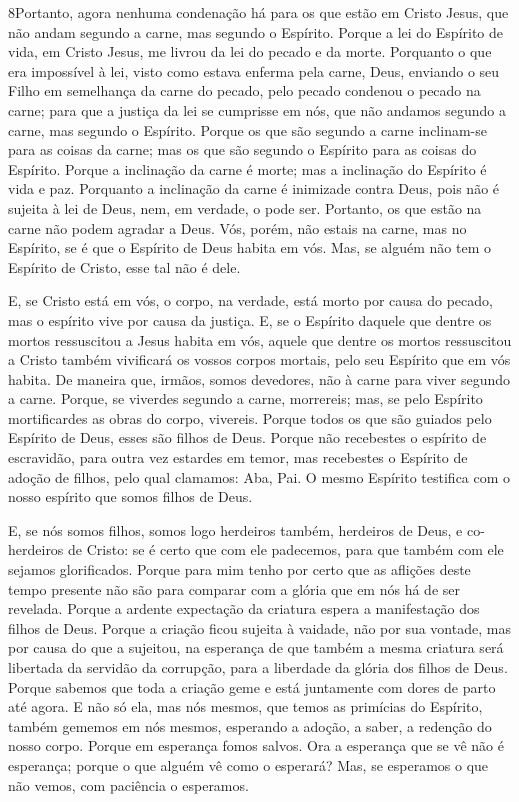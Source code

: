 \medskip

\lettrine{8} Portanto, agora nenhuma condenação há para os que
estão em Cristo Jesus, que não andam segundo a carne, mas segundo o
Espírito. Porque a lei do Espírito de vida, em Cristo Jesus, me
livrou da lei do pecado e da morte. Porquanto o que era
impossível à lei, visto como estava enferma pela carne, Deus,
enviando o seu Filho em semelhança da carne do pecado, pelo pecado
condenou o pecado na carne; para que a justiça da lei se
cumprisse em nós, que não andamos segundo a carne, mas segundo o
Espírito. Porque os que são segundo a carne inclinam-se para as
coisas da carne; mas os que são segundo o Espírito para as coisas do
Espírito. Porque a inclinação da carne é morte; mas a inclinação
do Espírito é vida e paz. Porquanto a inclinação da carne é
inimizade contra Deus, pois não é sujeita à lei de Deus, nem, em
verdade, o pode ser. Portanto, os que estão na carne não podem
agradar a Deus. Vós, porém, não estais na carne, mas no
Espírito, se é que o Espírito de Deus habita em vós. Mas, se alguém
não tem o Espírito de Cristo, esse tal não é dele.

E, se Cristo está em vós, o corpo, na verdade, está morto por
causa do pecado, mas o espírito vive por causa da justiça. E,
se o Espírito daquele que dentre os mortos ressuscitou a Jesus
habita em vós, aquele que dentre os mortos ressuscitou a Cristo
também vivificará os vossos corpos mortais, pelo seu Espírito que em
vós habita. De maneira que, irmãos, somos devedores, não à
carne para viver segundo a carne. Porque, se viverdes segundo
a carne, morrereis; mas, se pelo Espírito mortificardes as obras do
corpo, vivereis. Porque todos os que são guiados pelo
Espírito de Deus, esses são filhos de Deus. Porque não
recebestes o espírito de escravidão, para outra vez estardes em
temor, mas recebestes o Espírito de adoção de filhos, pelo qual
clamamos: Aba, Pai. O mesmo Espírito testifica com o nosso
espírito que somos filhos de Deus.

E, se nós somos filhos, somos logo herdeiros também, herdeiros de
Deus, e co-herdeiros de Cristo: se é certo que com ele padecemos,
para que também com ele sejamos glorificados. Porque para mim
tenho por certo que as aflições deste tempo presente não são para
comparar com a glória que em nós há de ser revelada. Porque a
ardente expectação da criatura espera a manifestação dos filhos de
Deus. Porque a criação ficou sujeita à vaidade, não por sua
vontade, mas por causa do que a sujeitou, na esperança de que
também a mesma criatura será libertada da servidão da corrupção,
para a liberdade da glória dos filhos de Deus. Porque sabemos
que toda a criação geme e está juntamente com dores de parto até
agora. E não só ela, mas nós mesmos, que temos as primícias
do Espírito, também gememos em nós mesmos, esperando a adoção, a
saber, a redenção do nosso corpo. Porque em esperança fomos
salvos. Ora a esperança que se vê não é esperança; porque o que
alguém vê como o esperará? Mas, se esperamos o que não vemos,
com paciência o esperamos.

